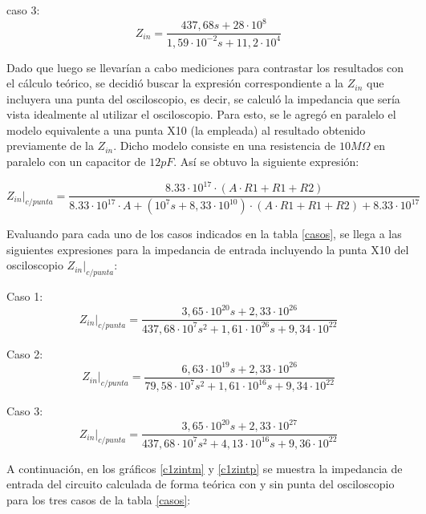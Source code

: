 caso 3:
\begin{equation}
	Z_{in} =  \frac{437,68 s + 28 \cdot 10^8}{1,59 \cdot 10^{-2} s + 11,2 \cdot 10^4}
	\label{c1c3zint}
\end{equation}


Dado que luego se llevar\'ian a cabo mediciones para contrastar los resultados con el c\'alculo te\'orico, se decidi\'o buscar la expresi\'on correspondiente a la $Z_{in}$ que incluyera una punta del osciloscopio, es decir, se calcul\'o la impedancia que ser\'ia vista idealmente al utilizar el osciloscopio. Para esto, se le agreg\'o en paralelo el modelo equivalente a una punta X10 (la empleada) al resultado obtenido previamente de la $Z_{in}$. Dicho modelo consiste en una resistencia de $10M\Omega$ en paralelo con un capacitor de $12pF$. As\'i se obtuvo la siguiente expresi\'on:

\begin{equation}
	Z_{in}\rvert_{c/punta} = \frac{8.33 \cdot 10^{17}\cdot (A \cdot R1 + R1 + R2)}{8.33 \cdot 10^{17} \cdot A + (10^7 s + 8,33 \cdot 10^{10}) \cdot (A \cdot R1 + R1 + R2) + 8.33 \cdot 10^{17}}
	\label{zinp}
\end{equation}

Evaluando para cada uno de los casos indicados en la tabla \ref{casos}, se llega a las siguientes expresiones para la impedancia de entrada incluyendo la punta X10 del osciloscopio $Z_{in}\rvert_{c/punta}$:

Caso 1:
\begin{equation}
	Z_{in}\rvert_{c/punta} = \frac{3,65 \cdot 10^{20} s + 2,33 \cdot 10^{26}}{437,68 \cdot 10^7 s^2 + 1,61 \cdot 10^{26} s + 9,34 \cdot 10^{22}}
	\label{c1c1zinp}
\end{equation}

Caso 2:
\begin{equation}
	Z_{in}\rvert_{c/punta} = \frac{6,63 \cdot 10^{19} s + 2,33 \cdot 10^{26}}{79,58 \cdot 10^7 s^2 + 1,61 \cdot 10^{16} s + 9,34 \cdot 10^{22}}
	\label{c1c2zinp}
\end{equation}

Caso 3:
\begin{equation}
	Z_{in}\rvert_{c/punta} = \frac{3,65 \cdot 10^{20} s + 2,33 \cdot 10^{27}}{437,68 \cdot 10^7 s^2 + 4,13 \cdot 10^{16} s + 9,36 \cdot 10^{22}}
	\label{c1c3zinp}
\end{equation}


A continuaci\'on, en los gr\'aficos \ref{c1zintm} y \ref{c1zintp} se muestra la impedancia de entrada del circuito calculada de forma te\'orica con y sin punta del osciloscopio para los tres casos de la tabla \ref{casos}:

